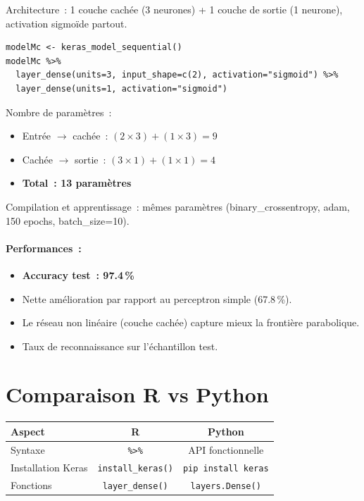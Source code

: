 \documentclass[a4paper,11pt]{article}
\begin{document}
Architecture~: 1 couche cach\'ee (3 neurones) + 1 couche de sortie (1 neurone),
activation sigmo\"ide partout.

\begin{lstlisting}
modelMc <- keras_model_sequential()
modelMc %>%
  layer_dense(units=3, input_shape=c(2), activation="sigmoid") %>%
  layer_dense(units=1, activation="sigmoid")
\end{lstlisting}

Nombre de param\`etres~:
\begin{itemize}
  \item Entr\'ee $\rightarrow$ cach\'ee~: $(2 \times 3) + (1 \times 3) = 9$
  \item Cach\'ee $\rightarrow$ sortie~: $(3 \times 1) + (1 \times 1) = 4$
  \item \textbf{Total~: 13 param\`etres}
\end{itemize}

Compilation et apprentissage~: m\^emes param\`etres (binary\_crossentropy,
adam, 150 epochs, batch\_size=10).

\paragraph{Performances~:}
\begin{itemize}
  \item \textbf{Accuracy test~: 97.4\,\%}
  \item Nette am\'elioration par rapport au perceptron simple (67.8\,\%).
  \item Le r\'eseau non lin\'eaire (couche cach\'ee) capture mieux la
    fronti\`ere parabolique.
  \item Taux de reconnaissance sur l'\'echantillon test.
\end{itemize}

\section{Comparaison R vs Python}

\begin{center}
\begin{tabular}{lcc}
\toprule
Aspect & R & Python \\
\midrule
Syntaxe & \texttt{\%\textgreater{}\%} & API fonctionnelle \\
Installation Keras & \texttt{install\_keras()} & \texttt{pip install keras} \\
Fonctions & \texttt{layer\_dense()} & \texttt{layers.Dense()} \\
\bottomrule
\end{tabular}
\end{center}
\end{document}
